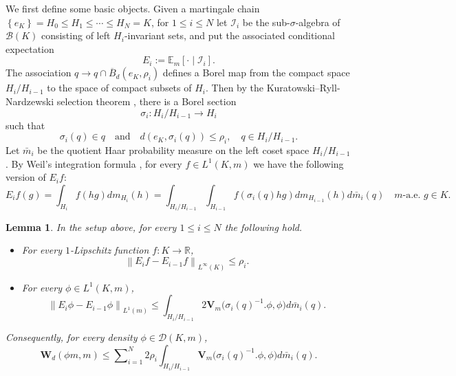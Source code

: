 \documentclass{amsart}
\providecommand{\lemmaname}{Lemma}
\numberwithin{equation}{subsection}
\theoremstyle{plain}
\newtheorem{lem}[lem]{\protect\lemmaname}
\theoremstyle{definition}
\theoremstyle{plain}
\begin{document}
We first define some basic objects. Given a martingale chain \(\left\{e_{K}\right\}=H_{0}\leq H_{1}\leq\dotsm\leq H_{N}=K\), for \(1\leq i\leq N\) let \(\mathcal{I}_{i}\) be the sub-\(\sigma\)-algebra of \(\mathcal{B}\left(K\right)\) consisting of left \(H_{i}\)-invariant sets, and put the associated conditional expectation
\[E_{i}:=\mathbb{E}_{m}\left[\cdot\mid\mathcal{I}_{i}\right].\]
The association \(q\to q\cap\overline{B}_{d}\left(e_{K},\rho_{i}\right)\) defines a Borel map from the compact space \(H_{i}/H_{i-1}\) to the space of compact subsets of \(H_{i}\). Then by the Kuratowski--Ryll-Nardzewski selection theorem \cite[Thm.~(12.13)]{kechris2012descriptive}, there is a Borel section
\[\sigma_{i}:H_{i}/H_{i-1}\to H_{i}\]
such that
\[\sigma_{i}\left(q\right)\in q\quad\text{and}\quad d\left(e_{K},\sigma_{i}\left(q\right)\right)\leq\rho_{i},\quad q\in H_{i}/H_{i-1}.\]
Let \(\bar{m}_{i}\) be the quotient Haar probability measure on the left coset space \(H_{i}/H_{i-1}\). By Weil's integration formula \cite[Thm.~(2.56)]{folland1995course}, for every \(f\in L^{1}\left(K,m\right)\) we have the following version of \(E_{i}f\):
\begin{equation}\label{eq:Weil}
E_{i}f\left(g\right)=\int_{H_{i}}f\left(hg\right)dm_{H_{i}}\left(h\right)=\int_{H_{i}/H_{i-1}}\int_{H_{i-1}}f\left(\sigma_{i}\left(q\right)hg\right)dm_{H_{i-1}}\left(h\right)d\bar{m}_{i}\left(q\right)\quad m\text{-a.e. }g\in K.
\end{equation}

\begin{lem}\label{lem:martcont}
In the setup above, for every \(1\leq i\leq N\) the following hold.
\begin{itemize}
    \item For every \(1\)-Lipschitz function \(f:K\to\mathbb{R}\),
    \[\left\|E_{i}f-E_{i-1}f\right\|_{L^{\infty}\left(K\right)}\leq\rho_{i}.\]
    \item For every \(\phi\in L^{1}\left(K,m\right)\),
    \[\left\|E_{i}\phi-E_{i-1}\phi\right\|_{L^{1}\left(m\right)}\leq\int_{H_{i}/H_{i-1}}2\mathbf{V}_{m}\big(\sigma_{i}\left(q\right)^{-1}.\phi,\phi\big)d\bar{m}_{i}\left(q\right).\]
\end{itemize}
Consequently, for every density \(\phi\in\mathcal{D}\left(K,m\right)\),
\[\mathbf{W}_{d}\left(\phi m,m\right)\leq\sum\nolimits_{i=1}^{N}2\rho_{i}\int_{H_{i}/H_{i-1}}\mathbf{V}_{m}\big(\sigma_{i}\left(q\right)^{-1}.\phi,\phi\big)d\bar{m}_{i}\left(q\right).\]
\end{lem}
\end{document}
